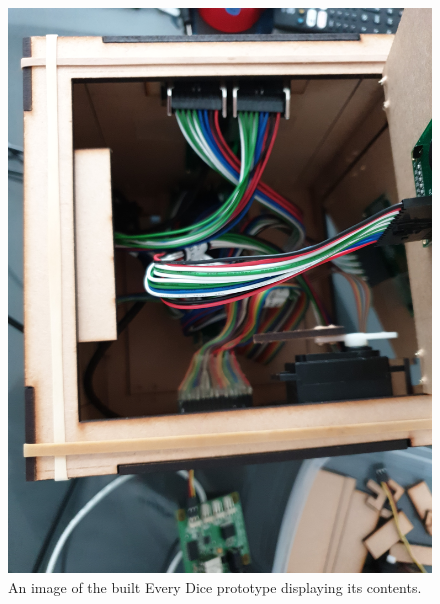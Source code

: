 \begin{figure}[ht!]
	\centering


	\includegraphics[width=0.8\linewidth]{./figures/hardware.jpg}
	
	\caption[The Built Every Dice]{An image of the built Every Dice prototype displaying its contents.}
	
	\label{fig:dice_hardware}
	
\end{figure}